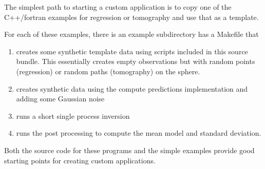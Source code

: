 \documentclass{article}
\begin{document}
The simplest path to starting a custom application is to copy one of
the C++/fortran examples for regression or tomography and use that as
a template.

For each of these examples, there is an example subdirectory
has a Makefile that

\begin{enumerate}
\item creates some synthetic template data using scripts included in this source
  bundle. This essentially creates empty observations but with random points (regression) or
  random paths (tomography) on the sphere.
\item creates synthetic data using the compute predictions implementation and adding
  some Gaussian noise
\item runs a short single process inversion
\item runs the post processing to compute the mean model and standard deviation.
\end{enumerate}

Both the source code for these programs and the simple examples provide good
starting points for creating custom applications.
\end{document}
